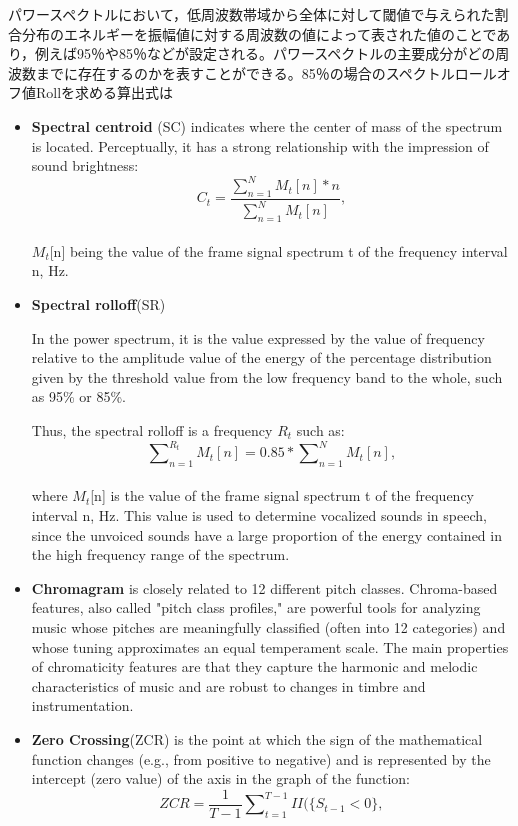パワースペクトルにおいて，低周波数帯域から全体に対して閾値で与えられた割合分布のエネルギーを振幅値に対する周波数の値によって表された値のことであり，例えば95％や85％などが設定される。パワースペクトルの主要成分がどの周波数までに存在するのかを表すことができる。85％の場合のスペクトルロールオフ値Rollを求める算出式は\documentclass[ams]{U-AizuGT}
\begin{document}
\begin{itemize}
\setlength{\leftskip}{-4mm}
\item {\textbf{Spectral centroid} (SC) indicates where the center of mass of the spectrum is located. Perceptually, it has a strong relationship with the impression of sound brightness:
\\
\begin{equation}
C_t=\frac{\sum\nolimits_{n=1}^N M_t[n]*n}{\sum\nolimits_{n=1}^N M_t[n]},
\end{equation}
\\
$M_t$[n] being the value of the frame signal spectrum t of the frequency interval n, Hz.
}
\item {\textbf{Spectral rolloff}(SR)\par
In the power spectrum, it is the value expressed by the value of frequency relative to the amplitude value of the energy of the percentage distribution given by the threshold value from the low frequency band to the whole, such as 95\% or 85\%.\par
Thus, the spectral rolloff is a frequency $R_t$ such as:
\\
\begin{equation}
\sum\nolimits_{n=1}^{R_t} M_t[n]=0.85*\sum\nolimits_{n=1}^N M_t[n],
\end{equation}
\\
where $M_t$[n] is the value of the frame signal spectrum t of the frequency interval n, Hz. This value is used to determine vocalized sounds in speech, since the unvoiced sounds have a large proportion of the energy contained in the high frequency range of the spectrum.
}
\item {\textbf{Chromagram} is closely related to 12 different pitch classes. Chroma-based features, also called "pitch class profiles," are powerful tools for analyzing music whose pitches are meaningfully classified (often into 12 categories) and whose tuning approximates an equal temperament scale. The main properties of chromaticity features are that they capture the harmonic and melodic characteristics of music and are robust to changes in timbre and instrumentation.}
\item {\textbf{Zero Crossing}(ZCR) is the point at which the sign of the mathematical function changes (e.g., from positive to negative) and is represented by the intercept (zero value) of the axis in the graph of the function:
\\
\begin{equation}
ZCR=\frac{1}{T-1}\sum\nolimits_{t=1}^{T-1} II(\{S_{t-1}<0\},

\end{equation}}
\end{itemize}
\end{document}
